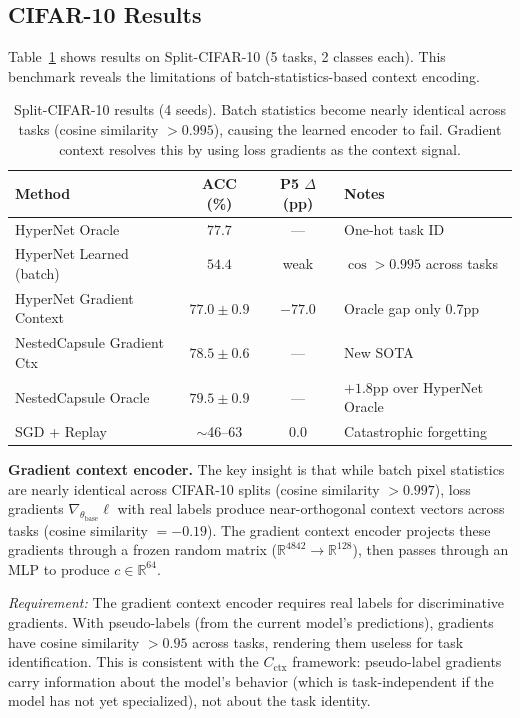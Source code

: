 \documentclass{article}
\begin{document}
\subsection{CIFAR-10 Results}
\label{app:cifar10}

Table~\ref{tab:cifar10} shows results on Split-CIFAR-10 (5 tasks, 2 classes each). This benchmark reveals the limitations of batch-statistics-based context encoding.

\begin{table}[h]
\centering
\caption{Split-CIFAR-10 results (4 seeds). Batch statistics become nearly identical across tasks (cosine similarity $> 0.995$), causing the learned encoder to fail. Gradient context resolves this by using loss gradients as the context signal.}
\label{tab:cifar10}
\small
\begin{tabular}{lccl}
\toprule
Method & ACC (\%) & P5 $\Delta$ (pp) & Notes \\
\midrule
HyperNet Oracle            & $77.7$          & ---     & One-hot task ID \\
HyperNet Learned (batch)   & $54.4$          & weak    & $\cos > 0.995$ across tasks \\
HyperNet Gradient Context  & $77.0 \pm 0.9$  & $-77.0$ & Oracle gap only 0.7pp \\
NestedCapsule Gradient Ctx & $78.5 \pm 0.6$  & ---     & New SOTA \\
NestedCapsule Oracle       & $79.5 \pm 0.9$  & ---     & $+1.8$pp over HyperNet Oracle \\
SGD + Replay               & $\sim$46--63    & $0.0$   & Catastrophic forgetting \\
\bottomrule
\end{tabular}
\end{table}

\textbf{Gradient context encoder.}
The key insight is that while batch pixel statistics are nearly identical across CIFAR-10 splits (cosine similarity $> 0.997$), loss gradients $\nabla_{\theta_\mathrm{base}} \ell$ with real labels produce near-orthogonal context vectors across tasks (cosine similarity $= -0.19$). The gradient context encoder projects these gradients through a frozen random matrix ($\mathbb{R}^{4842} \to \mathbb{R}^{128}$), then passes through an MLP to produce $c \in \mathbb{R}^{64}$.

\emph{Requirement:} The gradient context encoder requires real labels for discriminative gradients. With pseudo-labels (from the current model's predictions), gradients have cosine similarity $> 0.95$ across tasks, rendering them useless for task identification. This is consistent with the $C_\mathrm{ctx}$ framework: pseudo-label gradients carry information about the model's behavior (which is task-independent if the model has not yet specialized), not about the task identity.
\end{document}
